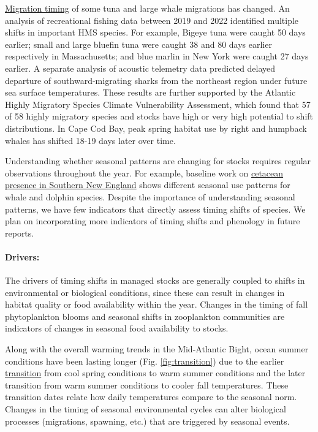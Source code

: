 \documentclass[
  10pt,
]{article}
\begin{document}
\href{https://noaa-edab.github.io/catalog/timing_shifts.html}{Migration
timing} of some tuna and large whale migrations has changed. An analysis
of recreational fishing data between 2019 and 2022 identified multiple
shifts in important HMS species. For example, Bigeye tuna were caught 50
days earlier; small and large bluefin tuna were caught 38 and 80 days
earlier respectively in Massachusetts; and blue marlin in New York were
caught 27 days earlier. A separate analysis of acoustic telemetry data
predicted delayed departure of southward-migrating sharks from the
northeast region under future sea surface temperatures. These results
are further supported by the Atlantic Highly Migratory Species Climate
Vulnerability Assessment, which found that 57 of 58 highly migratory
species and stocks have high or very high potential to shift
distributions. In Cape Cod Bay, peak spring habitat use by right and
humpback whales has shifted 18-19 days later over time.

Understanding whether seasonal patterns are changing for stocks requires
regular observations throughout the year. For example, baseline work on
\href{https://noaa-edab.github.io/catalog/cetacean_acoustic.html}{cetacean
presence in Southern New England} shows different seasonal use patterns
for whale and dolphin species. Despite the importance of understanding
seasonal patterns, we have few indicators that directly assess timing
shifts of species. We plan on incorporating more indicators of timing
shifts and phenology in future reports.

\paragraph{Drivers:}\label{drivers-1}

The drivers of timing shifts in managed stocks are generally coupled to
shifts in environmental or biological conditions, since these can result
in changes in habitat quality or food availability within the year.
Changes in the timing of fall phytoplankton blooms and seasonal shifts
in zooplankton communities are indicators of changes in seasonal food
availability to stocks.

Along with the overall warming trends in the Mid-Atlantic Bight, ocean
summer conditions have been lasting longer (Fig. \ref{fig:transition})
due to the earlier
\href{https://noaa-edab.github.io/catalog/trans_dates.html}{transition}
from cool spring conditions to warm summer conditions and the later
transition from warm summer conditions to cooler fall temperatures.
These transition dates relate how daily temperatures compare to the
seasonal norm. Changes in the timing of seasonal environmental cycles
can alter biological processes (migrations, spawning, etc.) that are
triggered by seasonal events.
\end{document}

